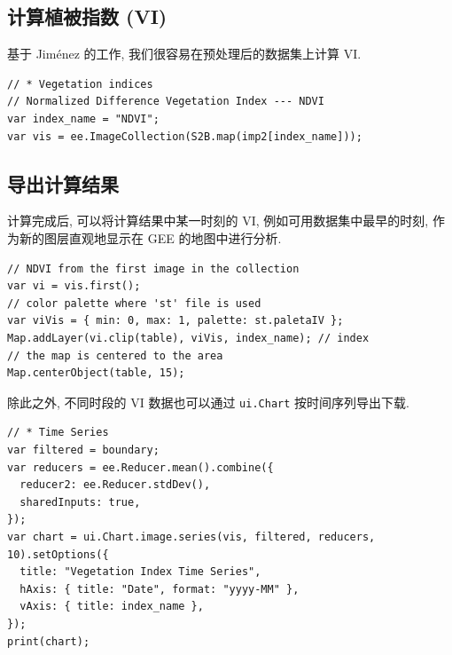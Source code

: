 \subsection{计算植被指数 (VI)}

基于 Jiménez \cite{jimenez-jimenez_vical_2022} 的工作, 我们很容易在预处理后的数据集上计算 VI.

\begin{verbatim}
// * Vegetation indices
// Normalized Difference Vegetation Index --- NDVI
var index_name = "NDVI";
var vis = ee.ImageCollection(S2B.map(imp2[index_name]));
\end{verbatim}

\subsection{导出计算结果}

计算完成后, 可以将计算结果中某一时刻的 VI, 例如可用数据集中最早的时刻, 作为新的图层直观地显示在 GEE 的地图中进行分析.

\begin{verbatim}
// NDVI from the first image in the collection
var vi = vis.first();
// color palette where 'st' file is used
var viVis = { min: 0, max: 1, palette: st.paletaIV };
Map.addLayer(vi.clip(table), viVis, index_name); // index
// the map is centered to the area
Map.centerObject(table, 15);
\end{verbatim}

除此之外, 不同时段的 VI 数据也可以通过 \verb|ui.Chart| 按时间序列导出下载.

\begin{verbatim}
// * Time Series
var filtered = boundary;
var reducers = ee.Reducer.mean().combine({
  reducer2: ee.Reducer.stdDev(),
  sharedInputs: true,
});
var chart = ui.Chart.image.series(vis, filtered, reducers, 10).setOptions({
  title: "Vegetation Index Time Series",
  hAxis: { title: "Date", format: "yyyy-MM" },
  vAxis: { title: index_name },
});
print(chart);
\end{verbatim}
